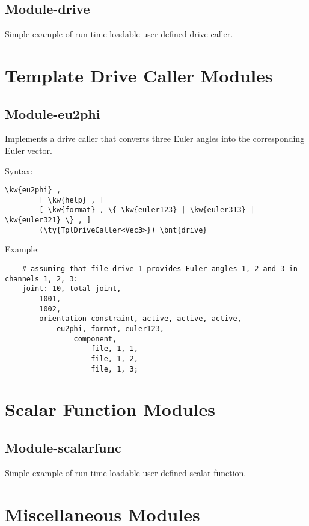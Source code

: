 \subsection{Module-drive}
Simple example of run-time loadable user-defined drive caller.



\section{Template Drive Caller Modules}

\subsection{Module-eu2phi}
Implements a  drive caller
that converts three Euler angles into the corresponding Euler vector.

Syntax:
\begin{Verbatim}[commandchars=\\\{\}]
    \kw{eu2phi} ,
        [ \kw{help} , ]
        [ \kw{format} , \{ \kw{euler123} | \kw{euler313} | \kw{euler321} \} , ]
        (\ty{TplDriveCaller<Vec3>}) \bnt{drive}
\end{Verbatim}
Example:
\begin{verbatim}
    # assuming that file drive 1 provides Euler angles 1, 2 and 3 in channels 1, 2, 3:
    joint: 10, total joint,
        1001,
        1002,
        orientation constraint, active, active, active,
            eu2phi, format, euler123,
                component,
                    file, 1, 1,
                    file, 1, 2,
                    file, 1, 3;
\end{verbatim}


\section{Scalar Function Modules}

\subsection{Module-scalarfunc}
Simple example of run-time loadable user-defined scalar function.



\section{Miscellaneous Modules}

